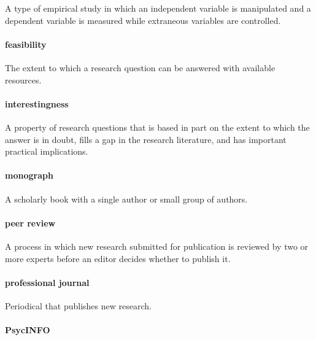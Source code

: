 \documentclass[
]{krantz}
\begin{document}
A type of empirical study in which an independent variable is manipulated and a dependent variable is measured while extraneous variables are controlled.

\hypertarget{feasibility-1}{%
\paragraph*{feasibility}\label{feasibility-1}}

The extent to which a research question can be answered with available resources.

\hypertarget{interestingness-1}{%
\paragraph*{interestingness}\label{interestingness-1}}

A property of research questions that is based in part on the extent to which the answer is in doubt, fills a gap in the research literature, and has important practical implications.

\hypertarget{monograph}{%
\paragraph*{monograph}\label{monograph}}

A scholarly book with a single author or small group of authors.

\hypertarget{peer-review}{%
\paragraph*{peer review}\label{peer-review}}

A process in which new research submitted for publication is reviewed by two or more experts before an editor decides whether to publish it.

\hypertarget{professional-journal}{%
\paragraph*{professional journal}\label{professional-journal}}

Periodical that publishes new research.

\hypertarget{psycinfo}{%
\paragraph*{PsycINFO}\label{psycinfo}}
\end{document}
